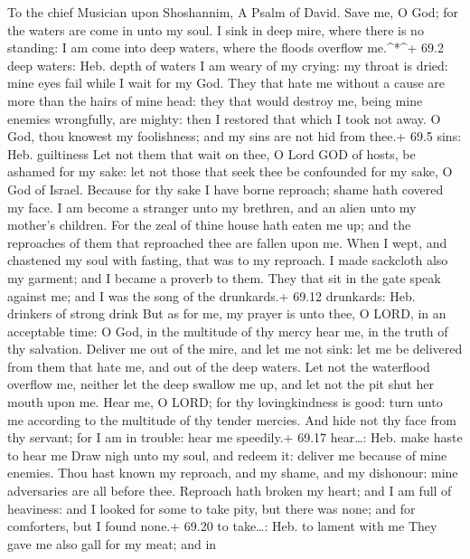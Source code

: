 To the chief Musician upon Shoshannim, A Psalm of David. 
Save me, O God; for the waters are come in unto my soul.  I
sink in deep mire, where there is no standing: I am come into deep
waters, where the floods overflow me.\^{}*\^{}+ 69.2 deep waters: Heb.
depth of waters  I am weary of my crying: my throat is
dried: mine eyes fail while I wait for my God.  They that
hate me without a cause are more than the hairs of mine head: they that
would destroy me, being mine enemies wrongfully, are mighty: then I
restored that which I took not away.  O God, thou knowest my
foolishness; and my sins are not hid from thee.+ 69.5 sins: Heb.
guiltiness  Let not them that wait on thee, O Lord GOD of
hosts, be ashamed for my sake: let not those that seek thee be
confounded for my sake, O God of Israel.  Because for thy
sake I have borne reproach; shame hath covered my face.  I
am become a stranger unto my brethren, and an alien unto my mother's
children.  For the zeal of thine house hath eaten me up; and
the reproaches of them that reproached thee are fallen upon me.
 When I wept, and chastened my soul with fasting, that was
to my reproach.  I made sackcloth also my garment; and I
became a proverb to them.  They that sit in the gate speak
against me; and I was the song of the drunkards.+ 69.12 drunkards: Heb.
drinkers of strong drink  But as for me, my prayer is unto
thee, O LORD, in an acceptable time: O God, in the multitude of thy
mercy hear me, in the truth of thy salvation.  Deliver me
out of the mire, and let me not sink: let me be delivered from them that
hate me, and out of the deep waters.  Let not the
waterflood overflow me, neither let the deep swallow me up, and let not
the pit shut her mouth upon me.  Hear me, O LORD; for thy
lovingkindness is good: turn unto me according to the multitude of thy
tender mercies.  And hide not thy face from thy servant;
for I am in trouble: hear me speedily.+ 69.17 hear\ldots: Heb. make
haste to hear me  Draw nigh unto my soul, and redeem it:
deliver me because of mine enemies.  Thou hast known my
reproach, and my shame, and my dishonour: mine adversaries are all
before thee.  Reproach hath broken my heart; and I am full
of heaviness: and I looked for some to take pity, but there was none;
and for comforters, but I found none.+ 69.20 to take\ldots: Heb. to
lament with me  They gave me also gall for my meat; and in
